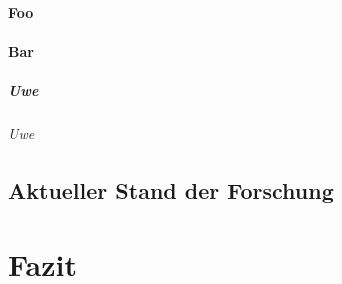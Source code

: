 \documentclass[ngerman,12pt,parskip=half]{scrreprt}
\begin{document}
\subsubsection{Foo}

\blindtext[5]

\subsubsection{Bar}

\blindtext[5]

\paragraph{Uwe} \blindtext

\subparagraph{Uwe} \blindtext

\section{Aktueller Stand der Forschung}

\blindtext[5]

\chapter{Fazit}

\blindtext[25]
\end{document}
